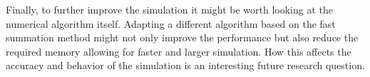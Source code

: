 \documentclass[a4paper,11pt]{kth-mag}
\begin{document}
Finally, to further improve the simulation it might be worth looking at the numerical algorithm itself. Adapting a different algorithm based on the fast summation method might not only improve the performance but also reduce the required memory allowing for faster and larger simulation. How this affects the accuracy and behavior of the simulation is an interesting future research question.

\printbibliography

\appendix
\addappheadtotoc
\end{document}
